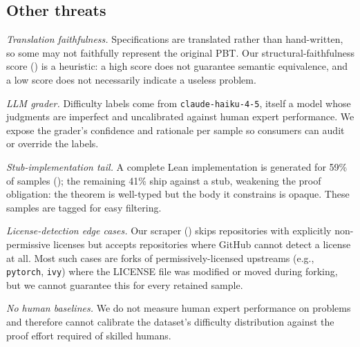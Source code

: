 \subsection{Other threats}
\label{sec:threats-other}

\emph{Translation faithfulness.} Specifications are translated rather than hand-written, so some may not faithfully represent the original PBT. Our structural-faithfulness score () is a heuristic: a high score does not guarantee semantic equivalence, and a low score does not necessarily indicate a useless problem.

\emph{LLM grader.} Difficulty labels come from \texttt{claude-haiku-4-5}, itself a model whose judgments are imperfect and uncalibrated against human expert performance. We expose the grader's confidence and rationale per sample so consumers can audit or override the labels.

\emph{Stub-implementation tail.} A complete Lean implementation is generated for 59\% of samples (); the remaining 41\% ship against a stub, weakening the proof obligation: the theorem is well-typed but the body it constrains is opaque. These samples are tagged for easy filtering.

\emph{License-detection edge cases.} Our scraper () skips repositories with explicitly non-permissive licenses but accepts repositories where GitHub cannot detect a license at all. Most such cases are forks of permissively-licensed upstreams (e.g., \texttt{pytorch}, \texttt{ivy}) where the LICENSE file was modified or moved during forking, but we cannot guarantee this for every retained sample.

\emph{No human baselines.} We do not measure human expert performance on \FVSpec problems and therefore cannot calibrate the dataset's difficulty distribution against the proof effort required of skilled humans.
